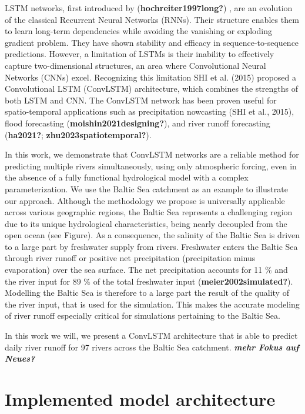 \documentclass[
]{agujournal2019}
\begin{document}
LSTM networks, first introduced by (\textbf{hochreiter1997long?}) , are
an evolution of the classical Recurrent Neural Networks (RNNs). Their
structure enables them to learn long-term dependencies while avoiding
the vanishing or exploding gradient problem. They have shown stability
and efficacy in sequence-to-sequence predictions. However, a limitation
of LSTMs is their inability to effectively capture two-dimensional
structures, an area where Convolutional Neural Networks (CNNs) excel.
Recognizing this limitation SHI et al. (2015) proposed a Convolutional
LSTM (ConvLSTM) architecture, which combines the strengths of both LSTM
and CNN. The ConvLSTM network has been proven useful for spatio-temporal
applications such as precipitation nowcasting (SHI et al., 2015), flood
forecasting (\textbf{moishin2021designing?}), and river runoff
forecasting (\textbf{ha2021?}; \textbf{zhu2023spatiotemporal?}).

In this work, we demonstrate that ConvLSTM networks are a reliable
method for predicting multiple rivers simultaneously, using only
atmospheric forcing, even in the absence of a fully functional
hydrological model with a complex parameterization. We use the Baltic
Sea catchment as an example to illustrate our approach. Although the
methodology we propose is universally applicable across various
geographic regions, the Baltic Sea represents a challenging region due
to its unique hydrological characteristics, being nearly decoupled from
the open ocean (see Figure). As a consequence, the salinity of the
Baltic Sea is driven to a large part by freshwater supply from rivers.
Freshwater enters the Baltic Sea through river runoff or positive net
precipitation (precipitation minus evaporation) over the sea surface.
The net precipitation accounts for 11 \(\%\) and the river input for 89
\(\%\) of the total freshwater input (\textbf{meier2002simulated?}).
Modelling the Baltic Sea is therefore to a large part the result of the
quality of the river input, that is used for the simulation. This makes
the accurate modeling of river runoff especially critical for
simulations pertaining to the Baltic Sea.

In this work we will, we present a ConvLSTM architecture that is able to
predict daily river runoff for 97 rivers across the Baltic Sea
catchment. \textbf{\emph{mehr Fokus auf Neues?}}

\hypertarget{implemented-model-architecture}{%
\section{Implemented model
architecture}\label{implemented-model-architecture}}
\end{document}
